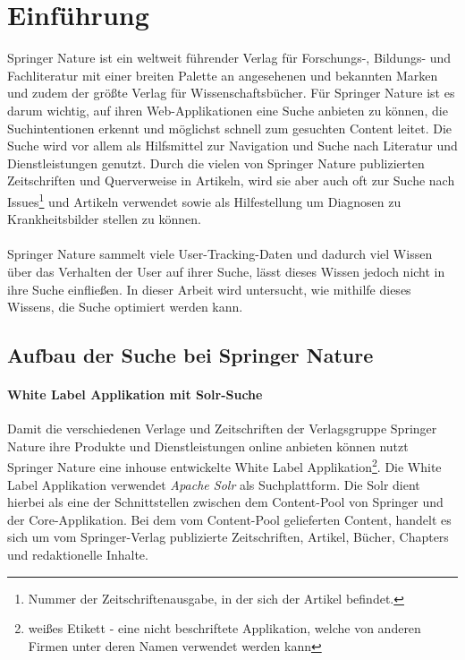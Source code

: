 %
\chapter{Einführung}
\label{sec:Einfuehrung}

Springer Nature ist ein weltweit führender Verlag für Forschungs-, Bildungs- und Fachliteratur mit einer breiten Palette an angesehenen und bekannten Marken und zudem der größte Verlag für Wissenschaftsbücher. Für Springer Nature ist es darum wichtig, auf ihren Web-Applikationen eine Suche anbieten zu können, die Suchintentionen erkennt und möglichst schnell zum gesuchten Content leitet. Die Suche wird vor allem als Hilfsmittel zur Navigation und Suche nach Literatur und Dienstleistungen genutzt. Durch die vielen von Springer Nature publizierten Zeitschriften und Querverweise in Artikeln, wird sie aber auch oft zur Suche nach Issues\footnote{Nummer der Zeitschriftenausgabe, in der sich der Artikel befindet.} und Artikeln verwendet sowie als Hilfestellung um Diagnosen zu Krankheitsbilder stellen zu können.
\\
\\
Springer Nature sammelt viele User-Tracking-Daten und dadurch viel Wissen über das Verhalten der User auf ihrer Suche, lässt dieses Wissen jedoch nicht in ihre Suche einfließen. In dieser Arbeit wird untersucht, wie mithilfe dieses Wissens, die Suche optimiert werden kann.

\section{Aufbau der Suche bei Springer Nature}
\label{sec:Einfuehrung:AufbauSucheBeiSpringerNature}

\subsubsection{White Label Applikation mit Solr-Suche}
\label{sec:Einfuehrung:AufbauSucheBeiSpringerNature:WhiteLabelApplikationSolr-Suche}

Damit die verschiedenen Verlage und Zeitschriften der Verlagsgruppe Springer Nature ihre Produkte und Dienstleistungen online anbieten können nutzt Springer Nature eine inhouse entwickelte White Label Applikation\footnote{\glqq weißes Etikett\grqq{} - eine nicht beschriftete Applikation, welche von anderen Firmen unter deren Namen verwendet werden kann}. Die White Label Applikation verwendet \textit{Apache Solr} als Suchplattform. Die Solr dient hierbei als eine der Schnittstellen zwischen dem Content-Pool von Springer und der Core-Applikation. Bei dem vom Content-Pool gelieferten Content, handelt es sich um vom Springer-Verlag publizierte Zeitschriften, Artikel, Bücher, Chapters und redaktionelle Inhalte.

